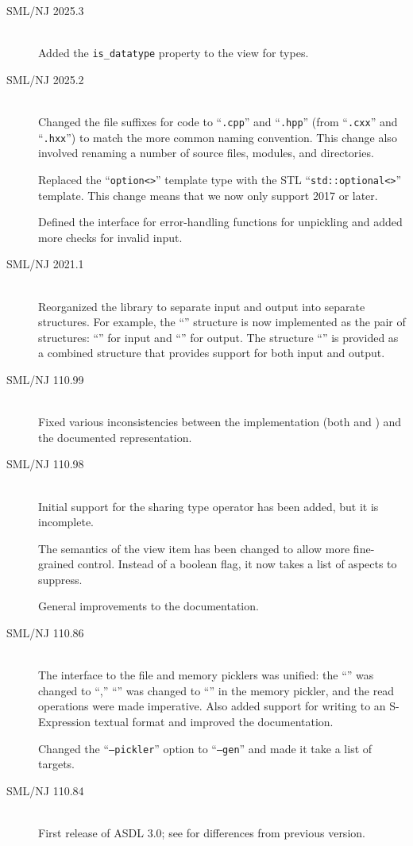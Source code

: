 \begin{description}
  \item[SML/NJ 2025.3]
    \mbox{}\\[0.5em]
    Added the \lstinline!is_datatype! property to the \sml{} view for types.

  \item[SML/NJ 2025.2]
    \mbox{}\\[0.5em]
    Changed the file suffixes for \Cplusplus{} code to ``\texttt{.cpp}'' and ``\texttt{.hpp}''
    (from ``\texttt{.cxx}'' and ``\texttt{.hxx}'') to match the more common naming convention.
    This change also involved renaming a number of source files, modules, and directories.

    Replaced the ``\texttt{option<>}'' template type with the STL ``\texttt{std::optional<>}''
    template.  This change means that we now only support \Cplusplus{} 2017 or later.

    Defined the interface for error-handling functions for unpickling and added more checks
    for invalid input.

  \item[SML/NJ 2021.1]
    \mbox{}\\[0.5em]
    Reorganized the \sml{} library to separate input and output into separate
    structures.  For example, the ``'' structure is now
    implemented as the pair of structures: ``'' for input
    and ``'' for output.  The structure ``''
    is provided as a combined structure that provides support for both input
    and output.

  \item[SML/NJ 110.99]
    \mbox{}\\[0.5em]
    Fixed various inconsistencies between the implementation (both \Cplusplus{} and
    \sml{}) and the documented representation.

  \item[SML/NJ 110.98]
    \mbox{}\\[0.5em]
    Initial support for the sharing type operator has been added, but it is incomplete.

    The semantics of the  view item has been changed to allow more
    fine-grained control.  Instead of a boolean flag, it now takes a list of
    aspects to suppress.

    General improvements to the documentation.

  \item[SML/NJ 110.86]
    \mbox{}\\[0.5em]
    The interface to the file and memory picklers was unified: the ``''
    was changed to ``,'' ``'' was changed to
    ``'' in the memory pickler, and the read operations were made
    imperative.
    Also added support for writing to an S-Expression textual format and improved
    the documentation.

    Changed the ``\texttt{--pickler}'' option to ``\texttt{--gen}'' and made it take
    a list of targets.

  \item[SML/NJ 110.84]
    \mbox{}\\[0.5em]
    First release of ASDL 3.0; see  for differences from previous
    version.
\end{description}%
